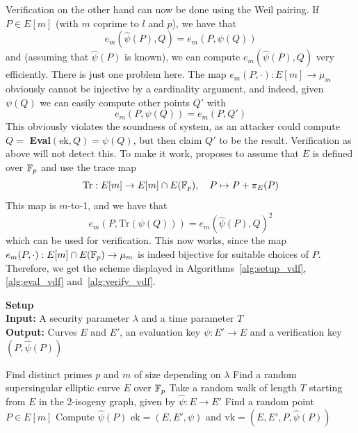 Verification on the other hand can now be done using the Weil pairing.
If $P \in E[m]$ (with $m$ coprime to $l$ and $p$), we have that
\begin{equation*}
    e_m(\hat{\psi}(P), Q) = e_m(P, \psi(Q))
\end{equation*}
and (assuming that $\hat{\psi}(P)$ is known), we can compute $e_m(\hat{\psi}(P), Q)$ very efficiently.
There is just one problem here.
The map $e_m(P, \cdot): E[m] \to \mu_m$ obviously cannot be injective by a cardinality argument, and indeed, given $\psi(Q)$ we can easily compute other points $Q'$ with
\begin{equation*}
    e_m(P, \psi(Q)) = e_m(P, Q')
\end{equation*}
This obviously violates the soundness of system, as an attacker could compute $Q = $ \textbf{Eval}$(\mathrm{ek}, Q) = \psi(Q)$, but then claim $Q'$ to be the result.
Verification as above will not detect this.
To make it work, \cite{verifiable_delay_function} proposes to assume that $E$ is defined over $\mathbb{F}_p$ and use the trace map
\begin{equation*}
    \mathrm{Tr}: E[m] \to E[m] \cap E(\mathbb{F}_p), \quad P \mapsto P + \pi_E(P)
\end{equation*}
This map is $m$-to-1, and we have that
\begin{equation*}
    e_m(P, \mathrm{Tr}(\psi(Q))) = e_m(\hat{\psi}(P), Q)^2
\end{equation*}
which can be used for verification.
This now works, since the map $e_m(P, \cdot): E[m] \cap E(\mathbb{F}_p) \to \mu_m$ is indeed bijective for suitable choices of $P$.
Therefore, we get the scheme displayed in Algorithms~\ref{alg:setup_vdf}, \ref{alg:eval_vdf} and~\ref{alg:verify_vdf}.
\begin{algorithm}
    \caption{\label{alg:setup_vdf} \textbf{Setup}\\
    \textbf{Input:} A security parameter $\lambda$ and a time parameter $T$\\
    \textbf{Output:} Curves $E$ and $E'$, an evaluation key $\psi: E' \to E$ and a verification key $(P, \hat{\psi}(P))$}
    \begin{algorithmic}[1]
        \State Find distinct primes $p$ and $m$ of size depending on $\lambda$
        \State Find a random supersingular elliptic curve $E$ over $\mathbb{F}_p$
        \State Take a random walk of length $T$ starting from $E$ in the 2-isogeny graph, given by $\hat{\psi}: E \to E'$
        \State Find a random point $P \in E[m]$
        \State Compute $\hat{\psi}(P)$
        \State\Return $\mathrm{ek} = (E, E', \psi)$ and $\mathrm{vk} = (E, E', P, \hat{\psi}(P))$
    \end{algorithmic}
\end{algorithm}
